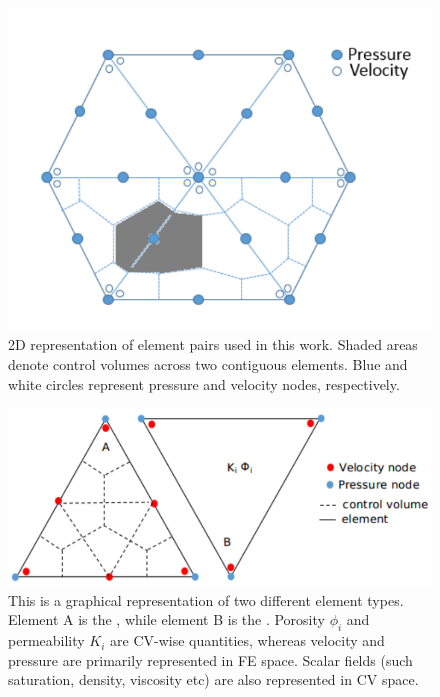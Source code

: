 


\begin{figure}[h]
\centering
\vbox{\includegraphics[width=.5\textwidth]{./Pics/P1DGP2.pdf}}
\caption{2D representation of  element pairs used in this work. Shaded areas denote control volumes across two contiguous elements. Blue and white circles represent pressure and velocity nodes, respectively.}
\label{fig:fem_cv}
\end{figure}

\clearpage

\begin{figure}[h]
\centering
\vbox{\includegraphics[width=.5\textwidth]{./Pics/element_n.pdf}}
\caption{This is a graphical representation of two different element types. Element A is the , while element B is the . Porosity $\phi_{i}$ and permeability $K_{i}$ are CV-wise quantities, whereas velocity and pressure are primarily represented in FE space. Scalar fields (such saturation, density, viscosity etc) are also represented in CV space.}
\label{fig:fem_elem}
\end{figure}

